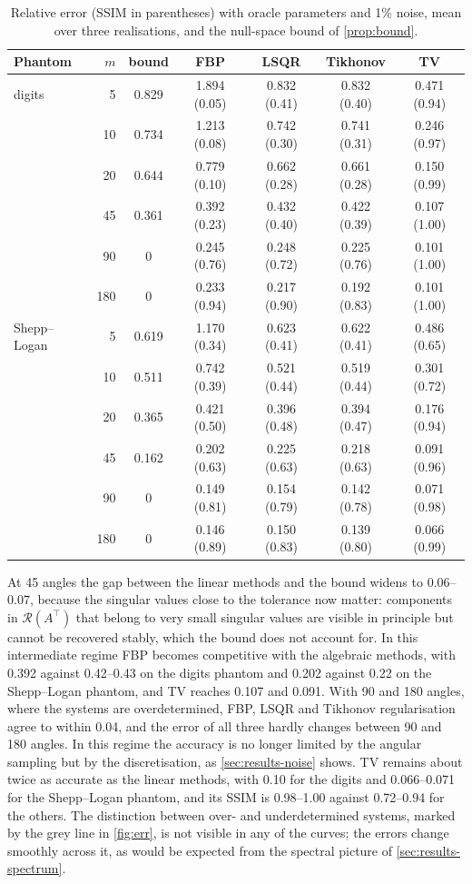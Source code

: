 \documentclass[11pt,a4paper]{article}
\numberwithin{equation}{section}
\theoremstyle{remark}
\newcommand{\RR}{\mathcal{R}}
\newcommand{\T}{\top}
\begin{document}
\begin{table}[t]
\centering
\caption{Relative error (SSIM in parentheses) with oracle parameters and 1\% noise, mean over three realisations, and the null-space bound of \cref{prop:bound}.}\label{tab:err}
\small
\begin{tabular}{lrccccc}
\toprule
Phantom & $m$ & bound & FBP & LSQR & Tikhonov & TV \\
\midrule
digits & 5 & 0.829 & 1.894 (0.05) & 0.832 (0.41) & 0.832 (0.40) & 0.471 (0.94) \\
 & 10 & 0.734 & 1.213 (0.08) & 0.742 (0.30) & 0.741 (0.31) & 0.246 (0.97) \\
 & 20 & 0.644 & 0.779 (0.10) & 0.662 (0.28) & 0.661 (0.28) & 0.150 (0.99) \\
 & 45 & 0.361 & 0.392 (0.23) & 0.432 (0.40) & 0.422 (0.39) & 0.107 (1.00) \\
 & 90 & 0 & 0.245 (0.76) & 0.248 (0.72) & 0.225 (0.76) & 0.101 (1.00) \\
 & 180 & 0 & 0.233 (0.94) & 0.217 (0.90) & 0.192 (0.83) & 0.101 (1.00) \\
\midrule
Shepp--Logan & 5 & 0.619 & 1.170 (0.34) & 0.623 (0.41) & 0.622 (0.41) & 0.486 (0.65) \\
 & 10 & 0.511 & 0.742 (0.39) & 0.521 (0.44) & 0.519 (0.44) & 0.301 (0.72) \\
 & 20 & 0.365 & 0.421 (0.50) & 0.396 (0.48) & 0.394 (0.47) & 0.176 (0.94) \\
 & 45 & 0.162 & 0.202 (0.63) & 0.225 (0.63) & 0.218 (0.63) & 0.091 (0.96) \\
 & 90 & 0 & 0.149 (0.81) & 0.154 (0.79) & 0.142 (0.78) & 0.071 (0.98) \\
 & 180 & 0 & 0.146 (0.89) & 0.150 (0.83) & 0.139 (0.80) & 0.066 (0.99) \\
\bottomrule
\end{tabular}
\end{table}

At 45 angles the gap between the linear methods and the bound widens to 0.06--0.07, because the singular values close to the tolerance now matter: components in $\RR(A^\T)$ that belong to very small singular values are visible in principle but cannot be recovered stably, which the bound does not account for. In this intermediate regime FBP becomes competitive with the algebraic methods, with 0.392 against 0.42--0.43 on the digits phantom and 0.202 against 0.22 on the Shepp--Logan phantom, and TV reaches 0.107 and 0.091. With 90 and 180 angles, where the systems are overdetermined, FBP, LSQR and Tikhonov regularisation agree to within 0.04, and the error of all three hardly changes between 90 and 180 angles. In this regime the accuracy is no longer limited by the angular sampling but by the discretisation, as \cref{sec:results-noise} shows. TV remains about twice as accurate as the linear methods, with 0.10 for the digits and 0.066--0.071 for the Shepp--Logan phantom, and its SSIM is 0.98--1.00 against 0.72--0.94 for the others. The distinction between over- and underdetermined systems, marked by the grey line in \cref{fig:err}, is not visible in any of the curves; the errors change smoothly across it, as would be expected from the spectral picture of \cref{sec:results-spectrum}.
\end{document}
